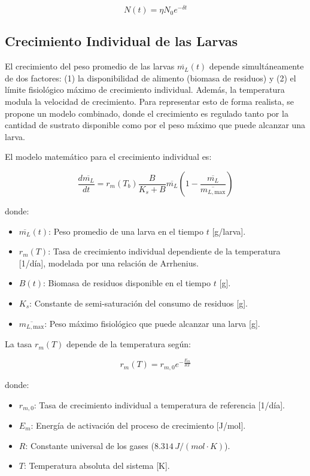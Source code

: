 \begin{equation}
N(t) = \eta N_0 e^{-\delta t}
\end{equation}

\subsection{Crecimiento Individual de las Larvas}

El crecimiento del peso promedio de las larvas $\overline{m_L}(t)$ depende simult\'aneamente de dos factores: (1) la disponibilidad de alimento (biomasa de residuos) y (2) el l\'imite fisiol\'ogico m\'aximo de crecimiento individual. Adem\'as, la temperatura modula la velocidad de crecimiento. Para representar esto de forma realista, se propone un modelo combinado, donde el crecimiento es regulado tanto por la cantidad de sustrato disponible como por el peso m\'aximo que puede alcanzar una larva.

El modelo matem\'atico para el crecimiento individual es:

\begin{equation}
\frac{d\overline{m_L}}{dt} = r_{m}(T_b) \frac{B}{K_s + B} \overline{m_L} \left( 1 - \frac{\overline{m_L}}{\overline{m_{L,\text{max}}}} \right)
\end{equation}

donde:

\begin{itemize}
    \item $\overline{m_L}(t)$: Peso promedio de una larva en el tiempo $t$ [g/larva].
    \item $r_m(T)$: Tasa de crecimiento individual dependiente de la temperatura [1/d\'ia], modelada por una relaci\'on de Arrhenius.
    \item $B(t)$: Biomasa de residuos disponible en el tiempo $t$ [g].
    \item $K_s$: Constante de semi-saturaci\'on del consumo de residuos [g].
    \item $\overline{m_{L,\text{max}}}$: Peso m\'aximo fisiol\'ogico que puede alcanzar una larva [g].
\end{itemize}

La tasa $r_m(T)$ depende de la temperatura seg\'un:

\begin{equation}
r_m(T) = r_{m,0} e^{-\frac{E_m}{RT}}
\end{equation}

donde:

\begin{itemize}
    \item $r_{m,0}$: Tasa de crecimiento individual a temperatura de referencia [1/d\'ia].
    \item $E_m$: Energ\'ia de activaci\'on del proceso de crecimiento [J/mol].
    \item $R$: Constante universal de los gases ($8.314\, J/(mol\cdot K)$).
    \item $T$: Temperatura absoluta del sistema [K].
\end{itemize}

